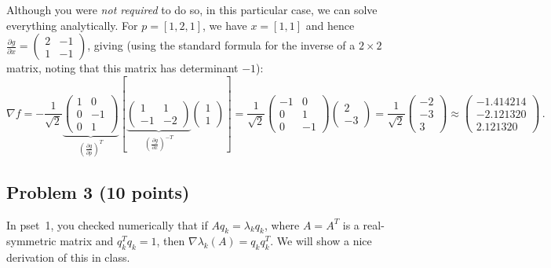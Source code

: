 \documentclass[10pt,oneside]{article}
\begin{document}
\begin{enumerate}
Although you were \emph{not required} to do so, in this particular case, we can solve everything analytically. For $p = [1,2,1]$, we have $x = [1,1]$ and hence $\frac{\partial g}{\partial x}= \begin{pmatrix} 2 & -1 \\  1 & -1 \end{pmatrix} $, giving (using the standard formula for the inverse of a $2 \times 2$ matrix, noting that this matrix has determinant $-1$):
 $$
 \nabla f = -\frac{1}{\sqrt{2}}\underbrace{\begin{pmatrix}
     1 & 0 \\ 0 & -1 \\ 0 & 1
     \end{pmatrix}}_{\left(\frac{\partial g}{\partial p}\right)^T} \left[ \underbrace{\begin{pmatrix}
     1 & 1 \\ -1 & -2
     \end{pmatrix}}_{\left(\frac{\partial g}{\partial x} \right)^{-T}} 
     \begin{pmatrix}
     1 \\ 1
     \end{pmatrix}
      \right] = \frac{1}{\sqrt{2}} \begin{pmatrix}
     -1 & 0 \\ 0 & 1 \\ 0 & -1
     \end{pmatrix} \begin{pmatrix}
     2 \\ -3 
     \end{pmatrix} = \boxed{\frac{1}{\sqrt{2}} \begin{pmatrix}
     -2 \\ -3 \\ 3 
     \end{pmatrix} \approx \begin{pmatrix}
      -1.414214 \\
 -2.121320 \\
  2.121320
     \end{pmatrix}} \, .
 $$
\end{enumerate}


\subsection*{Problem 3 (10 points)}

In pset~1, you checked numerically that if $Aq_k = \lambda_k q_k$, where $A=A^T$ is a real-symmetric matrix and $q_k^T q_k=1$, then $\nabla \lambda_k(A) = q_k q_k^T$.   We will show a nice derivation of this in class.
\end{document}
